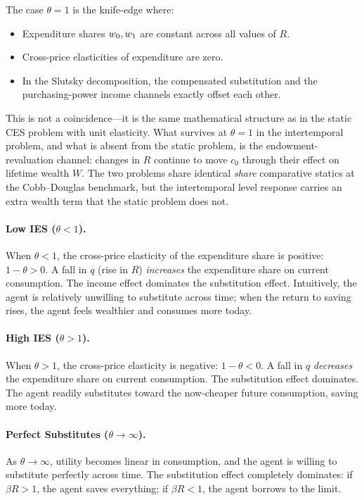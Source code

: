 \begin{calloutimportant}
The case $\theta = 1$ is the knife-edge where:
\begin{itemize}[nosep]
\item Expenditure shares $w_0, w_1$ are constant across all values of $R$.
\item Cross-price elasticities of expenditure are zero.
\item In the Slutsky decomposition, the compensated substitution and the purchasing-power income channels exactly offset each other.
\end{itemize}
This is not a coincidence---it is the same mathematical structure as in the static CES problem with unit elasticity. What survives at $\theta = 1$ in the intertemporal problem, and what is absent from the static problem, is the endowment-revaluation channel: changes in $R$ continue to move $c_0$ through their effect on lifetime wealth $W$. The two problems share identical \emph{share} comparative statics at the Cobb--Douglas benchmark, but the intertemporal level response carries an extra wealth term that the static problem does not.
\end{calloutimportant}

\paragraph{Low IES ($\theta < 1$).}
When $\theta < 1$, the cross-price elasticity of the expenditure share is positive: $1 - \theta > 0$. A fall in $q$ (rise in $R$) \emph{increases} the expenditure share on current consumption. The income effect dominates the substitution effect. Intuitively, the agent is relatively unwilling to substitute across time; when the return to saving rises, the agent feels wealthier and consumes more today.

\paragraph{High IES ($\theta > 1$).}
When $\theta > 1$, the cross-price elasticity is negative: $1 - \theta < 0$. A fall in $q$ \emph{decreases} the expenditure share on current consumption. The substitution effect dominates. The agent readily substitutes toward the now-cheaper future consumption, saving more today.

\paragraph{Perfect Substitutes ($\theta \to \infty$).}
As $\theta \to \infty$, utility becomes linear in consumption, and the agent is willing to substitute perfectly across time. The substitution effect completely dominates: if $\beta R > 1$, the agent saves everything; if $\beta R < 1$, the agent borrows to the limit.

